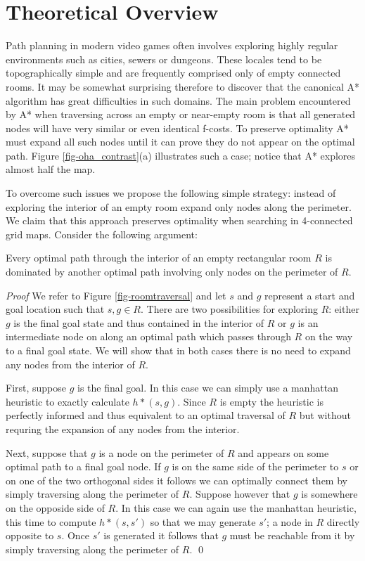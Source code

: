 \section{Theoretical Overview}
Path planning in modern video games often involves exploring highly regular 
environments such as cities, sewers or dungeons.
These locales tend to be topographically simple and are frequently comprised only
of empty connected rooms.
It may be somewhat surprising therefore to discover that the canonical A* 
algorithm\cite{hart68} has great difficulties in such domains.
The main problem encountered by A* when traversing across an empty or near-empty 
room is that all generated nodes will have very similar or even identical f-costs.
To preserve optimality A* must expand all such nodes until it can prove they do 
not appear on the optimal path.
Figure \ref{fig-oha_contrast}(a) illustrates such a case; 
notice that A* explores almost half the map. 
\par
To overcome such issues we propose the following simple strategy:
instead of exploring the interior of an empty room expand only nodes along the
perimeter. We claim that this approach preserves optimality when searching in 
4-connected grid maps. 
Consider the following argument:

\begin{theorem}
Every optimal path through the interior of an empty rectangular
room $R$ is dominated by another optimal path involving only nodes on the perimeter of $R$.
\end{theorem}
\emph{Proof} \newline
We refer to Figure \ref{fig-roomtraversal} and let $s$ and $g$ represent
a start and goal location such that $s, g \in R$.
There are two possibilities for exploring $R$: either $g$ is the final goal state
and thus contained in the interior of $R$ or $g$ is an intermediate node on along 
an optimal path which passes through $R$ on the way to a final goal state.
We will show that in both cases there is no need to expand any nodes from the interior of $R$.
\par
First, suppose $g$ is the final goal.
In this case we can simply use a manhattan heuristic to exactly calculate $h*(s, g)$.
Since $R$ is empty the heuristic is perfectly informed and thus equivalent to an optimal
traversal of $R$ but without requring the expansion of any nodes from the interior. 
\par
Next, suppose that $g$ is a node on the perimeter of $R$ and appears on some optimal path to
a final goal node. 
If $g$ is on the same side of the perimeter to $s$ or on one of the two orthogonal sides
it follows we can optimally connect them by simply traversing along the perimeter of $R$.
Suppose however that $g$ is somewhere on the opposide side of $R$. 
In this case we can again use the manhattan heuristic, this time to compute $h*(s, s')$
so that we may generate $s'$; a node in $R$ directly opposite to $s$.
Once $s'$ is generated it follows that $g$ must be reachable from it by simply traversing along
the perimeter of $R$.
\qed


